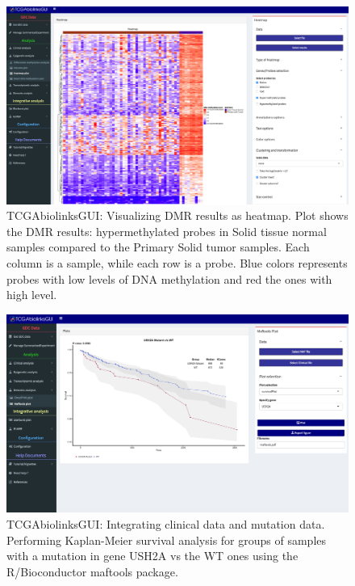 \begin{figure}
\includegraphics[width=1.0\linewidth]{images/gui_heatmap.png}
\caption[TCGAbiolinksGUI: Visualizing DMR results as heatmap]{TCGAbiolinksGUI: Visualizing DMR results as heatmap. Plot shows the DMR results: hypermethylated probes in Solid tissue normal samples compared to the Primary Solid tumor samples. Each column is a sample, while each row is a probe. Blue colors represents probes with low levels of DNA methylation and red the ones with high level. }
\label{fig:gui_heatmap}
\end{figure}

  \begin{figure}[h!]
  \centering
  \includegraphics[width=1.0\textwidth]{images/clinical_mutation.png}
  \caption{TCGAbiolinksGUI: Integrating clinical data and mutation data. Performing Kaplan-Meier survival analysis for groups of samples with a mutation in gene USH2A vs the WT ones using the R/Bioconductor maftools package.}
  \label{fig:mutation_clinical}
   \end{figure}


